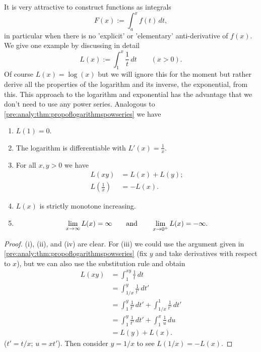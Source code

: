 \documentclass[10pt, a4paper]{article}
\begin{document}
It is very attractive to construct functions as integrals
\[
F(x) := \int_{a}^{x}f(t)\,dt,
\]
in particular when there is no 'explicit' or 'elementary' anti-derivative of $f(x)$.
We give one example by discussing in detail
\[
L(x) := \int_{1}^{x}\frac{1}{t}\,dt\qquad(x > 0).
\]
Of course $L(x) = \log(x)$ but we will ignore this for the moment but rather derive all the properties of the logarithm and its inverse,
the exponential,
from this.
This approach to the logarithm and exponential has the advantage that we don't need to use any power series.
Analogous to \autoref{pre:analy:thm:propoflogarithmspowseries} we have
\begin{theorem}\phantom{}
    \begin{enumerate}[label = (\roman*)]
        \item $L(1) = 0$.
        \item The logarithm is differentiable with $L'(x) = \frac{1}{x}$.
        \item For all $x, y > 0$ we have
        \begin{align*}
            L(xy) &= L(x) + L(y); \\
            L\left(\frac{1}{x}\right) &= -L(x).
        \end{align*}
        \item $L(x)$ is strictly monotone increasing.
        \item
        \[
        \liminfty[x]L(x) = \infty\qquad\text{and}\qquad\lim_{x \rightarrow 0 ^ {+}}L(x) = -\infty.
        \]
    \end{enumerate}
    \begin{proof}
        (i),
        (ii),
        and (iv) are clear.
        For (iii) we could use the argument given in \autoref{pre:analy:thm:propoflogarithmspowseries}
        (fix $y$ and take derivatives with respect to $x$),
        but we can also use the substitution rule and obtain
        \begin{align*}
            L(xy) &= \int_{1}^{xy}\frac{1}{t}\,dt \\
            &= \int_{1 / x}^{y}\frac{1}{t'}\,dt' \\
            &= \int_{1}^{y}\frac{1}{t'}\,dt' + \int_{1 / x}^{1}\frac{1}{t'}\,dt' \\
            &= \int_{1}^{y}\frac{1}{t'}\,dt' + \int_{1}^{x}\frac{1}{u}\,du \\
            &= L(y) + L(x).
        \end{align*}
        ($t' = t / x$; $u = xt'$).
        Then consider $y = 1 / x$ to see $L(1 / x) = -L(x)$.

\end{proof}
\end{theorem}
\end{document}

